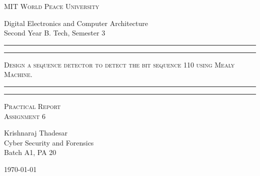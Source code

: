 \documentclass[11pt]{article}
\begin{document}
\begin{titlepage}
	\centering


	\huge\textsc{
		MIT World Peace University
	}\\

	\vspace{0.75\baselineskip} %

	\LARGE{
		Digital Electronics and Computer Architecture\\
		Second Year B. Tech, Semester 3
	}

	\vfill %


	\rule{\textwidth}{1.6pt}\vspace*{-\baselineskip}\vspace*{2pt}
	\rule{\textwidth}{0.6pt}
	\vspace{0.75\baselineskip} %



	\huge{\textsc{
			Design a sequence detector to detect the bit sequence 110 using Mealy Machine.
		}} \\



	\vspace{0.5\baselineskip} %
	\rule{\textwidth}{0.6pt}\vspace*{-\baselineskip}\vspace*{2.8pt}
	\rule{\textwidth}{1.6pt}

	\vspace{1\baselineskip} %


	\LARGE\textsc{
		Practical Report\\
		Assignment 6
	} %
	\vfill


	\vspace{0.5\baselineskip} %

	\Large{
		Krishnaraj Thadesar \\
		Cyber Security and Forensics\\
		Batch A1, PA 20
	}


	\vspace{0.5\baselineskip} %
	\today

\end{titlepage}
\end{document}

